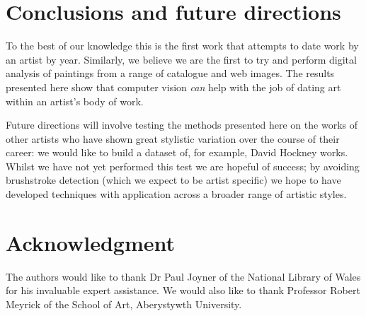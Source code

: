 \documentclass[conference,a4paper]{IEEEtran}
\begin{document}

\section{Conclusions and future directions}

To the best of our knowledge this is the first work that attempts to date work
by an artist by year. Similarly, we believe we are the first to try and perform
digital analysis of paintings from a range of catalogue and web images. The
results presented here show that computer vision \emph{can} help with the job
of dating art within an artist's body of work. 

Future directions will involve testing the methods presented here on the works
of other artists who have shown great stylistic variation over the course of
their career: we would like to build a dataset of, for example, David Hockney
works.  Whilst we have not yet performed this test we are hopeful of success;
by avoiding brushstroke detection (which we expect to be artist specific) we
hope to have developed techniques with application across a broader range of
artistic styles. 





\section*{Acknowledgment}


The authors would like to thank Dr Paul Joyner of the National Library of Wales
for his invaluable expert assistance. We would also like to thank Professor
Robert Meyrick of the School of Art, Aberystywth University.










\end{document}
